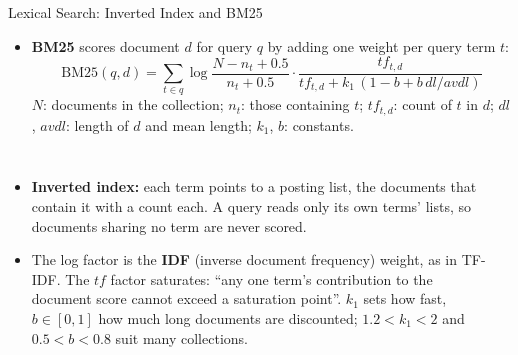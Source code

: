 \begin{frame}{Lexical Search: Inverted Index and BM25}
  \begin{itemize}\footnotesize
    \item[\textcolor{red}{$\blacktriangleright$}] \textbf{BM25} scores document $d$ for query $q$ by adding one weight per query term $t$:
      \[ \text{BM25}(q,d) = \sum_{t \in q} \log\frac{N - n_t + 0.5}{n_t + 0.5} \cdot \frac{tf_{t,d}}{tf_{t,d} + k_1\,(1 - b + b\, dl/avdl)} \]
      {\scriptsize $N$: documents in the collection; $n_t$: those containing $t$; $tf_{t,d}$: count of $t$ in $d$; $dl$, $avdl$: length of $d$ and mean length; $k_1$, $b$: constants.}
  \end{itemize}
  \begin{columns}[T,onlytextwidth]
      \begin{itemize}\footnotesize\itemsep0.3em
        \item[\textcolor{red}{$\blacktriangleright$}] \textbf{Inverted index:} each term points to a posting list, the documents that contain it with a count each. A query reads only its own terms' lists, so documents sharing no term are never scored.
        \item[\textcolor{red}{$\blacktriangleright$}] The log factor is the \textbf{IDF} (inverse document frequency) weight, as in TF-IDF. The $tf$ factor saturates: ``any one term's contribution to the document score cannot exceed a saturation point''. $k_1$ sets how fast, $b \in [0,1]$ how much long documents are discounted; $1.2 < k_1 < 2$ and $0.5 < b < 0.8$ suit many collections.
      \end{itemize}
      {\centering
      }
\end{columns}
\end{frame}
